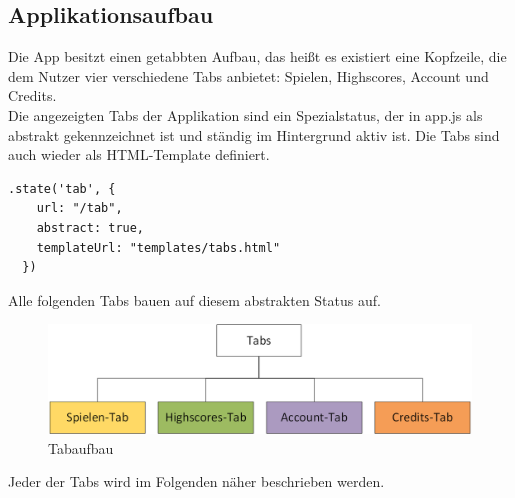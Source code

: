 \subsection{Applikationsaufbau}
Die App besitzt einen getabbten Aufbau, das heißt es existiert eine Kopfzeile, die dem Nutzer vier verschiedene Tabs anbietet: Spielen, Highscores, Account und Credits. 
\\
Die angezeigten Tabs der Applikation sind ein Spezialstatus, der in app.js als abstrakt gekennzeichnet ist und ständig im Hintergrund aktiv ist. Die Tabs sind auch wieder als HTML-Template definiert.
\begin{lstlisting}
.state('tab', {
    url: "/tab",
    abstract: true,
    templateUrl: "templates/tabs.html"
  })
\end{lstlisting}
Alle folgenden Tabs bauen auf diesem abstrakten Status auf.
\begin{figure}[h]
\centering
\includegraphics[width=1\textwidth]{ref/images/tabs.png}
\caption[Tabaufbau]{Tabaufbau}
\label{fig:Tabaufbau}
\end{figure}

Jeder der Tabs wird im Folgenden näher beschrieben werden.
\newpage
